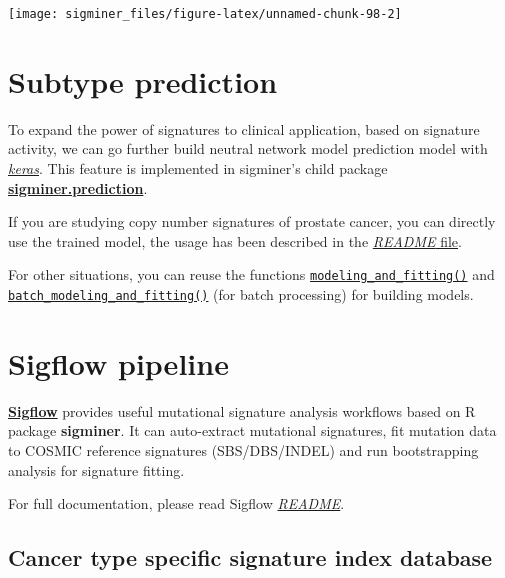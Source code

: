 \documentclass[
  12pt,
  a4paper,
  twoside]{book}
\begin{document}
\texttt{[image: sigminer\_files/figure-latex/unnamed-chunk-98-2]}

\hypertarget{subtype-prediction}{%
\chapter{Subtype prediction}\label{subtype-prediction}}

To expand the power of signatures to clinical application, based on signature activity, we can go further build neutral network model prediction model with \href{https://keras.io/}{\emph{keras}}. This feature is implemented in sigminer's child package \href{https://github.com/ShixiangWang/sigminer.prediction}{\textbf{sigminer.prediction}}.

If you are studying copy number signatures of prostate cancer, you can directly use the trained model, the usage has been described in the
\href{https://github.com/ShixiangWang/sigminer.prediction/blob/master/README.md}{\emph{README} file}.

For other situations, you can reuse the functions \href{https://github.com/ShixiangWang/sigminer.prediction/blob/master/R/modeling_and_fitting.R}{\texttt{modeling\_and\_fitting()}}
and \href{https://github.com/ShixiangWang/sigminer.prediction/blob/master/R/batch_modeling_and_fitting.R}{\texttt{batch\_modeling\_and\_fitting()}} (for batch processing) for building models.

\hypertarget{sigflow}{%
\chapter{Sigflow pipeline}\label{sigflow}}

\href{https://github.com/ShixiangWang/sigflow}{\textbf{Sigflow}} provides useful mutational signature analysis workflows based on R package \textbf{sigminer}. It can auto-extract mutational signatures, fit mutation data to COSMIC reference signatures (SBS/DBS/INDEL) and run bootstrapping analysis for signature fitting.

For full documentation, please read Sigflow \href{https://github.com/ShixiangWang/sigflow}{\emph{README}}.

\hypertarget{cancer-type-specific-signature-index-database}{%
\section{Cancer type specific signature index database}\label{cancer-type-specific-signature-index-database}}
\end{document}
